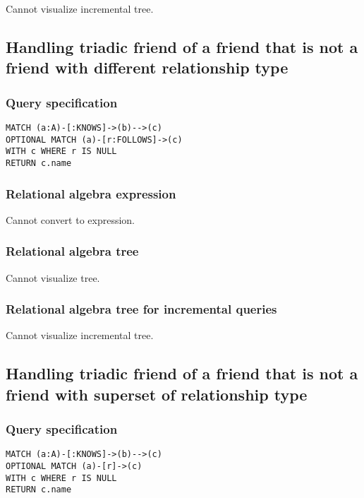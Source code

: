Cannot visualize incremental tree.

\subsection{Handling triadic friend of a friend that is not a friend with different relationship type}

\subsubsection*{Query specification}

\begin{lstlisting}
MATCH (a:A)-[:KNOWS]->(b)-->(c)
OPTIONAL MATCH (a)-[r:FOLLOWS]->(c)
WITH c WHERE r IS NULL
RETURN c.name
\end{lstlisting}

\subsubsection*{Relational algebra expression}

Cannot convert to expression.

\subsubsection*{Relational algebra tree}

Cannot visualize tree.

\subsubsection*{Relational algebra tree for incremental queries}

Cannot visualize incremental tree.

\subsection{Handling triadic friend of a friend that is not a friend with superset of relationship type}

\subsubsection*{Query specification}

\begin{lstlisting}
MATCH (a:A)-[:KNOWS]->(b)-->(c)
OPTIONAL MATCH (a)-[r]->(c)
WITH c WHERE r IS NULL
RETURN c.name
\end{lstlisting}


